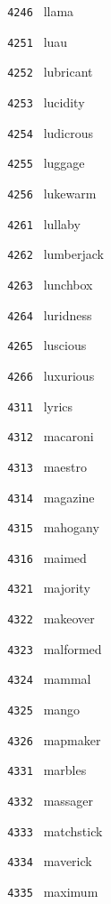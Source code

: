 \documentclass[11pt]{article}
\begin{document}
\begin{multicols}{6}
\noindent \texttt{ 4246 } llama  \par
\vspace{3mm}
\noindent \texttt{ 4251 } luau  \par
\noindent \texttt{ 4252 } lubricant  \par
\noindent \texttt{ 4253 } lucidity  \par
\noindent \texttt{ 4254 } ludicrous  \par
\noindent \texttt{ 4255 } luggage  \par
\noindent \texttt{ 4256 } lukewarm  \par
\vspace{3mm}
\noindent \texttt{ 4261 } lullaby  \par
\noindent \texttt{ 4262 } lumberjack  \par
\noindent \texttt{ 4263 } lunchbox  \par
\noindent \texttt{ 4264 } luridness  \par
\noindent \texttt{ 4265 } luscious  \par
\noindent \texttt{ 4266 } luxurious  \par
\noindent \texttt{ 4311 } lyrics  \par
\noindent \texttt{ 4312 } macaroni  \par
\noindent \texttt{ 4313 } maestro  \par
\noindent \texttt{ 4314 } magazine  \par
\noindent \texttt{ 4315 } mahogany  \par
\noindent \texttt{ 4316 } maimed  \par
\vspace{3mm}
\noindent \texttt{ 4321 } majority  \par
\noindent \texttt{ 4322 } makeover  \par
\noindent \texttt{ 4323 } malformed  \par
\noindent \texttt{ 4324 } mammal  \par
\noindent \texttt{ 4325 } mango  \par
\noindent \texttt{ 4326 } mapmaker  \par
\vspace{3mm}
\noindent \texttt{ 4331 } marbles  \par
\noindent \texttt{ 4332 } massager  \par
\noindent \texttt{ 4333 } matchstick  \par
\noindent \texttt{ 4334 } maverick  \par
\noindent \texttt{ 4335 } maximum  \par

\end{multicols}
\end{document}
